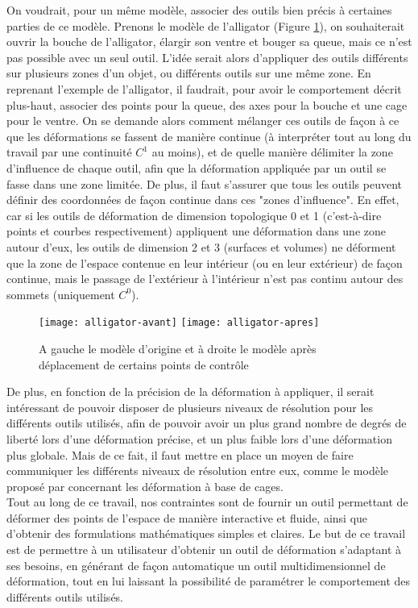 On voudrait, pour un même modèle, associer des outils bien précis à
certaines parties de ce modèle. Prenons le modèle de l'alligator
(Figure \ref{INTall}), on souhaiterait ouvrir la bouche de
l'alligator, élargir son ventre et bouger sa queue, mais ce n'est pas
possible avec un seul outil. L'idée serait alors d'appliquer des
outils différents sur plusieurs zones d'un objet, ou différents outils
sur une même zone. En reprenant l'exemple de l'alligator, il faudrait,
pour avoir le comportement décrit plus-haut, associer des points pour
la queue, des axes pour la bouche et une cage pour le ventre. On se
demande alors comment mélanger ces outils de façon à ce que les
déformations se fassent de manière continue (à interpréter tout au
long du travail par une continuité $C^1$ au moins), et de quelle
manière délimiter la zone d'influence de chaque outil, afin que la
déformation appliquée par un outil se fasse dans une zone limitée. De
plus, il faut s'assurer que tous les outils peuvent définir des
coordonnées de façon continue dans ces "zones d'influence". En effet,
car si les outils de déformation de dimension topologique 0 et 1
(c'est-à-dire points et courbes respectivement) appliquent une
déformation dans une zone autour d'eux, les outils de dimension 2 et 3
(surfaces et volumes) ne déforment que la zone de l'espace contenue en
leur intérieur (ou en leur extérieur) de façon continue, mais le
passage de l'extérieur à l'intérieur n'est pas continu autour des
sommets (uniquement $C^0$).
\\


\begin{figure}[h]
  \texttt{[image: alligator-avant]}
  \texttt{[image: alligator-apres]}
  \caption{A gauche le modèle d'origine et à droite le modèle après
    déplacement de certains points de contrôle}
  \label{INTall}
\end{figure}

De plus, en fonction de la précision de la déformation à appliquer, il
serait intéressant de pouvoir disposer de plusieurs niveaux de
résolution pour les différents outils utilisés, afin de pouvoir avoir
un plus grand nombre de degrés de liberté lors d'une déformation
précise, et un plus faible lors d'une déformation plus globale. Mais
de ce fait, il faut mettre en place un moyen de faire communiquer les
différents niveaux de résolution entre eux, comme le modèle proposé
par \cite{Hur12} concernant les déformation à base de cages.
\\

Tout au long de ce travail, nos contraintes sont de fournir un outil
permettant de déformer des points de l'espace de manière interactive
et fluide, ainsi que d'obtenir des formulations mathématiques simples et
claires. Le but de ce travail est de permettre à un utilisateur
d'obtenir un outil de déformation s'adaptant à ses besoins, en
générant de façon automatique un outil multidimensionnel de
déformation, tout en lui laissant la possibilité de paramétrer le
comportement des différents outils utilisés.



